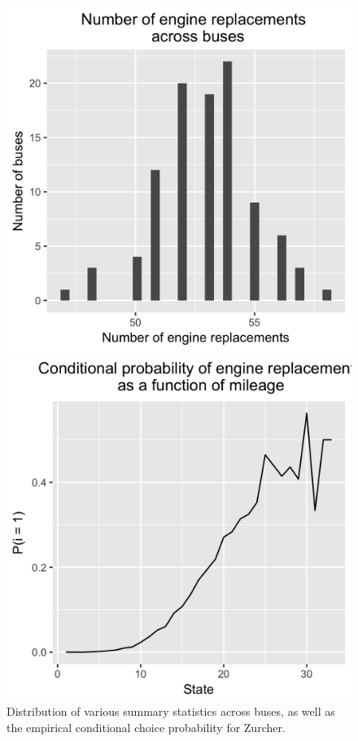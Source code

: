 \documentclass[paper=a4, fontsize=11pt]{scrartcl} %
\numberwithin{equation}{section} %
\numberwithin{figure}{section} %
\numberwithin{table}{section} %
\begin{document}
\begin{itemize}
\begin{itemize}
\begin{figure}
\begin{minipage}[b]{.48\linewidth}
	\end{minipage}
		\begin{minipage}[b]{.48\linewidth}
	\includegraphics[scale=.15]{replacements_plot.png}
	\end{minipage}
	\begin{minipage}[b]{.48\linewidth}
	\includegraphics[scale=.15]{ccp_plot.png}
	\end{minipage}
	\caption{Distribution of various summary statistics across buses, as well as the empirical conditional choice probability for Zurcher.}
	\label{fig:summary_statistics}
\end{figure}


\end{itemize}
\end{itemize}
\end{document}

